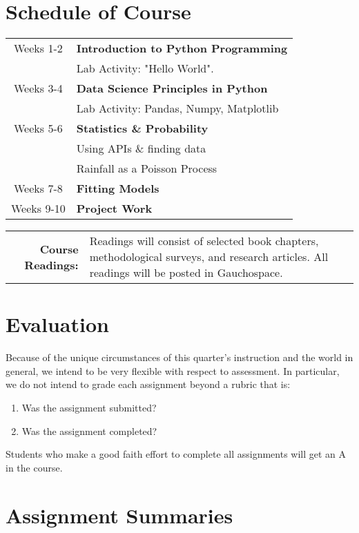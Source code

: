 \documentclass[12pt]{report}
\begin{document}
\section{Schedule of Course}

\begin{tabular}{c  | p{5.2in} }
	Weeks 1-2 & \bf{Introduction to Python Programming} \\
	          & Lab Activity: "Hello World". \\
	Weeks 3-4 & \bf{Data Science Principles in Python} \\
	           & Lab Activity: Pandas, Numpy, Matplotlib \\
    Weeks 5-6 & \bf{Statistics \& Probability} \\ 
               & Using APIs \& finding data \\
          	   & Rainfall as a Poisson Process \\
	Weeks 7-8 & \bf{Fitting Models} \\
	Weeks 9-10 & \bf{Project Work} \\
\end{tabular} 


\begin{tabular}{r p{4.25in}}
\textbf{Course Readings: } &  Readings will consist of selected book chapters, methodological surveys, and research articles. All readings will be posted in  Gauchospace.\\
\end{tabular}

\section{Evaluation}

Because of the unique circumstances of this quarter's instruction and the world in general, we intend to be very flexible with respect to assessment. In particular, we do not intend to grade each assignment beyond a rubric that is:

\begin{enumerate}
\item Was the assignment submitted?
\item Was the assignment completed?
\end{enumerate}

Students who make a good faith effort to complete all assignments will get an A in the course.

\section{Assignment Summaries}
\end{document}
